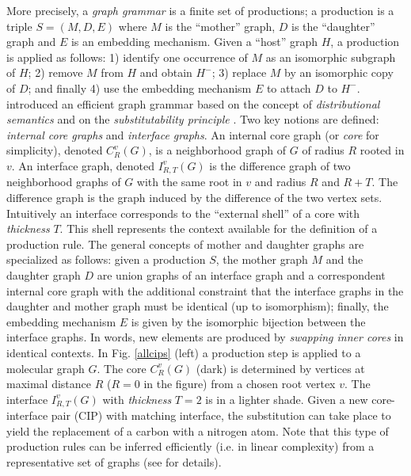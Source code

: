 \documentclass{article}
\begin{document}
More precisely, a {\em graph grammar} \citep{rozenberg1999handbook} is a
finite set of productions; a production is a triple $S=(M,D,E)$ where $M$ is
the ``mother'' graph, $D$ is the ``daughter'' graph and $E$ is an embedding
mechanism. Given a ``host'' graph $H$, a production is applied as follows: 1)
identify one occurrence of $M$ as an isomorphic subgraph of $H$; 2) remove $M$
from $H$ and obtain $H^-$; 3) replace $M$ by an isomorphic copy of $D$; and
finally 4) use the embedding mechanism $E$ to attach $D$ to $H^-$.
\cite{costa16} introduced an efficient graph grammar based on the concept of
{\em distributional semantics}
\citep{harris1954distributional,harris1968mathematical} and on the {\em
substitutability principle} \citep{Clark:2007}. Two key notions are defined:
{\em internal core graphs} and {\em interface graphs}. An internal core graph
(or {\em core} for simplicity), denoted $C^v_R(G)$, is a neighborhood graph of
$G$ of radius $R$ rooted in $v$. An interface graph, denoted $I^v_{R,T}(G)$ is
the difference graph of two neighborhood graphs of $G$ with the same root in
$v$ and radius $R$ and $R+T$. The difference graph is the graph induced by
the difference of the two vertex sets. Intuitively an interface
corresponds to the ``external shell'' of a core with {\em thickness} $T$. This
shell represents the context available for the definition of a production
rule. The general concepts of mother and daughter graphs are specialized as
follows: given a production $S$, the mother graph $M$ and the daughter graph
$D$ are union graphs of an interface graph and a correspondent internal core
graph with the additional constraint that the interface graphs in the daughter
and mother graph must be identical (up to isomorphism); finally, the embedding
mechanism $E$ is given by the isomorphic bijection between the interface
graphs. In words, new elements are produced by {\em swapping inner cores} in
identical contexts. In Fig. \ref{allcips} (left) a production step is applied
to a molecular graph $G$. The core $C_{R}^v(G)$ (dark) is determined by
vertices at maximal distance $R$ ($R=0$ in the figure) from a chosen root
vertex $v$. The interface $I_{R,T}^v(G)$ with \emph{thickness} $T=2$ is in a
lighter shade. Given a new core-interface pair (CIP) with matching interface,
the substitution can take place to yield the replacement of a carbon with a
nitrogen atom. Note that this type of production rules can be inferred
efficiently (i.e. in linear complexity) from a representative set of graphs
(see \citep{costa16} for details).
\end{document}
